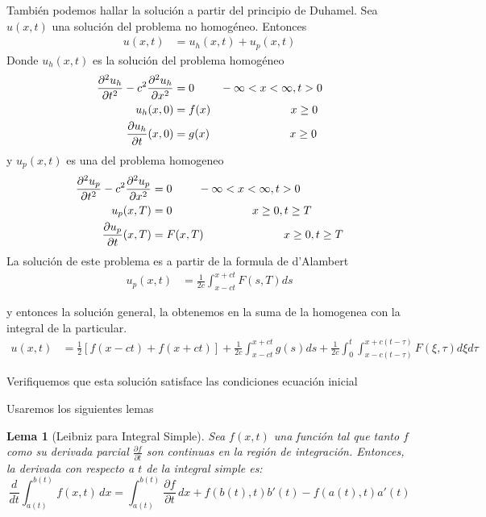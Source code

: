 \documentclass[11pt]{book}
\theoremstyle{plain}
\newtheorem{lema}[proposición]{Lema}
\theoremstyle{definition}
\begin{document}
También podemos hallar la solución a partir del principio de Duhamel. Sea $u(x,t)$ una solución del problema no homogéneo. Entonces
\begin{align*}
    u(x,t) &= u_{h}(x,t) + u_{p}(x,t)
\end{align*}
Donde $u_{h}(x,t)$ es la solución del problema homogéneo
\begin{align*}
    \frac{\partial^2 u_{h}}{\partial t^2} - c^2 \frac{\partial^2 u_{h}}{\partial x^2}&= 0 \hspace{8mm} -\infty<x<\infty, t > 0\\ 
    u_{h}(x,0)&= f(x) \hspace{25mm} x \geq 0\\
    \frac{\partial u_{h}}{\partial t}(x,0) &= g(x) \hspace{25mm} x \geq 0
\end{align*}
y $u_{p}(x,t)$ es una del problema homogeneo
\begin{align*}
    \frac{\partial^2 u_{p}}{\partial t^2} - c^2 \frac{\partial^2 u_{p}}{\partial x^2}&= 0 \hspace{8mm} -\infty<x<\infty, t > 0\\ 
    u_{p}(x,T)&= 0 \hspace{25mm} x \geq 0, t\geq T\\
    \frac{\partial u_{p}}{\partial t}(x,T) &= F(x,T) \hspace{25mm} x \geq 0, t\geq T
\end{align*}
La solución de este problema es a partir de la formula de d'Alambert
\begin{align*}
    u_{p}(x,t) &= \frac{1}{2c}\int_{x -ct}^{x+ct} F(s,T) ds
\end{align*}

y entonces la solución general, la obtenemos en la suma de la homogenea con la integral de la particular.
\begin{align*}
    u(x,t) &= \frac{1}{2}[f(x-ct) + f(x+ct)] + \frac{1}{2c}\int_{x -ct}^{x+ct} g(s) ds + \frac{1}{2c}\int_{0}^{t}\int_{x-c(t-\tau)}^{x+c(t-\tau)}F(\xi,\tau)d\xi d\tau
\end{align*}

Verifiquemos que esta solución satisface las condiciones ecuación inicial

Usaremos los siguientes lemas

\begin{lema}[Leibniz para Integral Simple]
Sea \( f(x, t) \) una función tal que tanto \( f \) como su derivada parcial \( \frac{\partial f}{\partial t} \) son continuas en la región de integración. Entonces, la derivada con respecto a \( t \) de la integral simple es:
\[
\frac{d}{dt} \int_{a(t)}^{b(t)} f(x, t) \, dx = \int_{a(t)}^{b(t)} \frac{\partial f}{\partial t} \, dx + f(b(t), t) b'(t) - f(a(t), t) a'(t)
\]
\end{lema}
\end{document}
